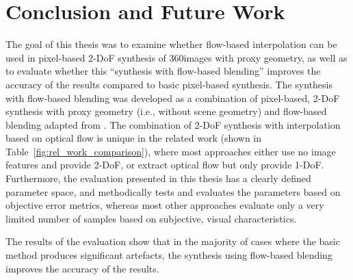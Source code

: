 \chapter{Conclusion and Future Work}\label{chap:conclusion}

The goal of this thesis was to examine whether flow-based interpolation can be used in pixel-based 2-DoF synthesis of 360\degree images with proxy geometry, as well as to evaluate whether this ``synthesis with flow-based blending'' improves the accuracy of the results compared to basic pixel-based synthesis.
The synthesis with flow-based blending was developed as a combination of pixel-based, 2-DoF synthesis with proxy geometry (i.e., without scene geometry) and flow-based blending adapted from \cite{megastereo}. The combination of 2-DoF synthesis with interpolation based on optical flow is unique in the related work (shown in Table~\ref{fig:rel_work_comparison}), where most approaches either use no image features and provide 2-DoF, or extract optical flow but only provide 1-DoF. Furthermore, the evaluation presented in this thesis has a clearly defined parameter space, and methodically tests and evaluates the parameters based on objective error metrics, whereas most other approaches evaluate only a very limited number of samples based on subjective, visual characteristics.

The results of the evaluation show that in the majority of cases where the basic method produces significant artefacts, the synthesis using flow-based blending improves the accuracy of the results.

